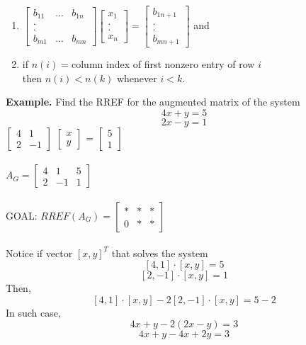 \documentclass [12pt]{article}
\begin{document}
\begin{enumerate}[(1)]
    \item $\begin{bmatrix}
    b_{11}&...&b_{1n}\\
    .\\
    .\\
    b_{m1}&...&b_{mn}
    \end{bmatrix}\begin{bmatrix}
    x_1\\
    .\\
    .\\
    x_n
    \end{bmatrix}=\begin{bmatrix}
    b_{1n+1}\\
    .\\
    .\\
    b_{mn+1}
    \end{bmatrix}$ and
    \item if $n(i)=$column index of first nonzero entry of row $i$\\
    then $n(i)<n(k)$ whenever $i<k$.
\end{enumerate}
\noindent\textbf{Example. }Find the RREF for the augmented matrix of the system
\[4x+y=5\]
\[2x-y=1\]
$\begin{bmatrix}
4&1\\
2&-1
\end{bmatrix}$ $\begin{bmatrix}
    x\\
    y
\end{bmatrix}$
= $\begin{bmatrix}
    5\\
    1
\end{bmatrix}$\\\\
$A_G=\begin{bmatrix}
4&1&5\\
2&-1&1
\end{bmatrix}$\\\\
GOAL: $RREF(A_G)=\begin{bmatrix}
*&*&*\\
0&*&*
\end{bmatrix}$\\\\
Notice if vector $[x,y]^T$ that solves the system
\[[4,1]\cdot[x,y]=5\]
\[[2,-1]\cdot[x,y]=1\]
Then,
\[[4,1]\cdot[x,y] - 2[2,-1]\cdot[x,y] = 5-2\]
In such case, 
\[4x+y-2(2x-y)=3\]
\[4x+y-4x+2y=3\]
\end{document}
